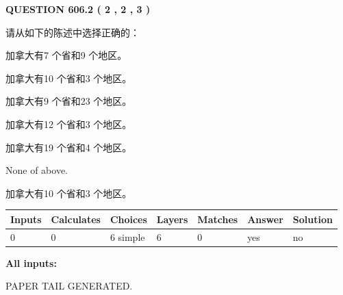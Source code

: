 \documentclass{ctexart}
\begin{document}
   
  
\vspace{0.2in}
  
{\textbf{\Large{QUESTION
606.2 
 ( 2 , 2 , 3 )
}}}
  
  
请从如下的陈述中选择正确的：
 
 
加拿大有7 个省和9 个地区。
 
 
加拿大有10 个省和3 个地区。
 
 
加拿大有9 个省和23 个地区。
 
 
加拿大有12 个省和3 个地区。
 
 
加拿大有19 个省和4 个地区。
 
 
 None of above.
 
 
\noindent{}
 
 
加拿大有10 个省和3 个地区。
 
 
\noindent{}
 
 
   
   
   
   
\noindent\begin{tabular}{|l|l|l|l|l|l|l|}
 \hline
Inputs & Calculates & Choices & Layers & Matches & Answer & Solution \\ \hline
 0  & 
 0  & 
 6
  simple  
  & 
 6  & 
 0  & 
  yes & 
  no 
  \\ \hline
 \end{tabular}
   
   
   
   
\noindent{}
   
   
   
   
\noindent\vspace{0.1in}\hspace{-0.08in} {\textbf{\Large{All inputs: }}}
   
   
   
   
   
   
 \vspace{0.2in}
 
   
   
\vspace{2.0in} PAPER TAIL GENERATED.
   
\end{document}
